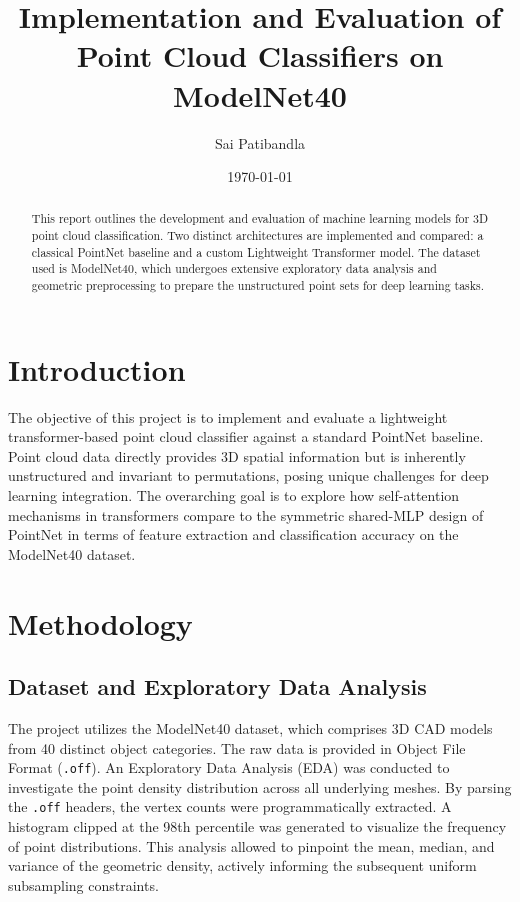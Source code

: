 \documentclass{article}
\title{Implementation and Evaluation of Point Cloud Classifiers on ModelNet40}
\author{Sai Patibandla}
\date{\today}
\begin{document}
\maketitle

\begin{abstract}
This report outlines the development and evaluation of machine learning models for 3D point cloud classification. Two distinct architectures are implemented and compared: a classical PointNet baseline and a custom Lightweight Transformer model. The dataset used is ModelNet40, which undergoes extensive exploratory data analysis and geometric preprocessing to prepare the unstructured point sets for deep learning tasks.
\end{abstract}

\section{Introduction}
The objective of this project is to implement and evaluate a lightweight transformer-based point cloud classifier against a standard PointNet baseline. Point cloud data directly provides 3D spatial information but is inherently unstructured and invariant to permutations, posing unique challenges for deep learning integration. The overarching goal is to explore how self-attention mechanisms in transformers compare to the symmetric shared-MLP design of PointNet in terms of feature extraction and classification accuracy on the ModelNet40 dataset.

\section{Methodology}

\subsection{Dataset and Exploratory Data Analysis}
The project utilizes the ModelNet40 dataset, which comprises 3D CAD models from 40 distinct object categories. The raw data is provided in Object File Format (\texttt{.off}). 
An Exploratory Data Analysis (EDA) was conducted to investigate the point density distribution across all underlying meshes. By parsing the \texttt{.off} headers, the vertex counts were programmatically extracted. A histogram clipped at the 98th percentile was generated to visualize the frequency of point distributions. This analysis allowed to pinpoint the mean, median, and variance of the geometric density, actively informing the subsequent uniform subsampling constraints.
\end{document}
